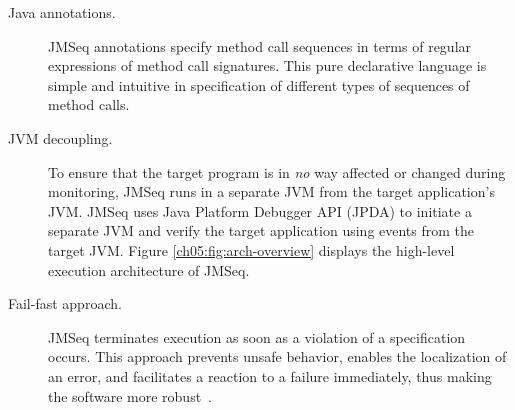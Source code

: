 \begin{description}
   \item[Java annotations.] 
JMSeq annotations specify  method call sequences  in terms of regular expressions of method call signatures.
 This pure declarative language is simple and intuitive in  specification  of  different types of sequences of method calls.
   \item[JVM decoupling.]
To ensure that the target program is in \emph{no} way affected or changed during monitoring, JMSeq runs in a separate JVM from the target application's JVM.
   JMSeq uses Java Platform Debugger API (JPDA) \cite{JPDA_Home} to initiate a separate JVM and verify the target application using events from the target JVM.
  Figure \ref{ch05:fig:arch-overview} displays the high-level execution architecture of JMSeq.
   \item[Fail-fast approach.] JMSeq terminates execution as soon as a violation of a specification occurs.  This approach prevents unsafe behavior,
   enables the localization of an error, and facilitates a reaction
   to a failure immediately, thus making the software more robust~\cite{Shore04a}.
\end{description}


